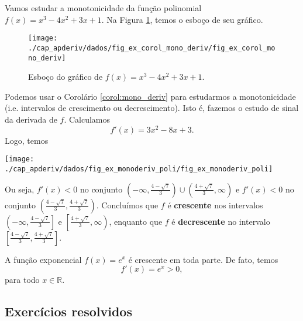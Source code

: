 \begin{ex}
  Vamos estudar a monotonicidade da função polinomial $f(x) = x^3 - 4x^2 + 3x + 1$. Na Figura \ref{fig:ex_corol_mono_deriv}, temos o esboço de seu gráfico.
  
  \begin{figure}[H]
    \centering
    \texttt{[image: ./cap\_apderiv/dados/fig\_ex\_corol\_mono\_deriv/fig\_ex\_corol\_mono\_deriv]}
    \caption{Esboço do gráfico de $f(x) = x^3 - 4x^2 + 3x + 1$.}
    \label{fig:ex_corol_mono_deriv}
  \end{figure}

  Podemos usar o Corolário \ref{corol:mono_deriv} para estudarmos a monotonicidade (i.e. intervalos de crescimento ou decrescimento). Isto é, fazemos o estudo de sinal da derivada de $f$. Calculamos
  \begin{equation}
    f'(x) = 3x^2 - 8x + 3.
  \end{equation}
  Logo, temos
  \begin{center}
    \texttt{[image: ./cap\_apderiv/dados/fig\_ex\_monoderiv\_poli/fig\_ex\_monoderiv\_poli]}
  \end{center}
  Ou seja, $f'(x) < 0$ no conjunto $\displaystyle \left(-\infty, \frac{4-\sqrt{7}}{3}\right)\cup \left(\frac{4+\sqrt{7}}{3}, \infty\right)$ e $f'(x) < 0$ no conjunto $\displaystyle \left(\frac{4-\sqrt{7}}{3}, \frac{4+\sqrt{7}}{3}\right)$. Concluímos que $f$ é {\bf crescente} nos intervalos $\displaystyle \left(\left.-\infty, \frac{4-\sqrt{7}}{3}\right.\right]$ e $\displaystyle \left[\left.\frac{4+\sqrt{7}}{3}, \infty\right)\right.$, enquanto que $f$ é {\bf decrescente} no intervalo $\displaystyle \left[\frac{4-\sqrt{7}}{3}, \frac{4+\sqrt{7}}{3}\right]$.
\end{ex}

\begin{ex}
  A função exponencial $f(x) = e^x$ é crescente em toda parte. De fato, temos
  \begin{equation}
    f'(x) = e^x > 0,
  \end{equation}
  para todo $x\in\mathbb{R}$.
\end{ex}

\subsection{Exercícios resolvidos}


